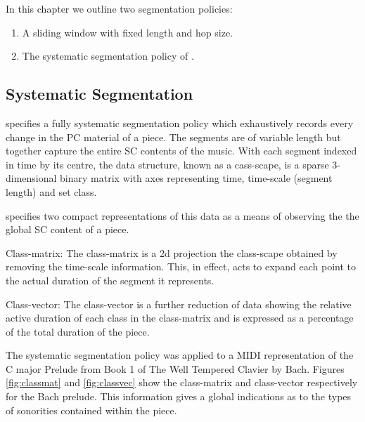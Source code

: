 \documentclass{article}
\begin{document}
In this chapter we outline two segmentation policies:
\begin{enumerate}
\item A sliding window with fixed length and hop size.
\item The systematic segmentation policy of \citet{Martorell2013}.
\end{enumerate}
\subsection{Systematic Segmentation}
\label{sec-8-1}

\citet[chap. 5.3]{Martorell2013} specifies a fully systematic
segmentation policy which exhaustively records every change in the PC
material of a piece. The segments are of variable length but together
capture the entire SC contents of the music. With each segment indexed
in time by its centre, the data structure, known as a cass-scape, is a
sparse 3-dimensional binary matrix with axes representing time,
time-scale (segment length) and set class.

\citet[chap. 5.3.5]{Martorell2013} specifies two compact
representations of this data as a means of observing the the global SC
content of a piece.

Class-matrix: The class-matrix is a 2d projection the class-scape
obtained by removing the time-scale information. This, in effect, acts
to expand each point to the actual duration of the segment it
represents.

Class-vector: The class-vector is a further reduction of data showing
the relative active duration of each class in the class-matrix and is
expressed as a percentage of the total duration of the piece.

The systematic segmentation policy was applied to a MIDI
representation of the C major Prelude from Book 1 of The Well Tempered
Clavier by Bach. Figures \ref{fig:classmat} and \ref{fig:classvec}
show the class-matrix and class-vector respectively for the Bach
prelude. This information gives a global indications as to the types
of sonorities contained within the piece.
\end{document}
